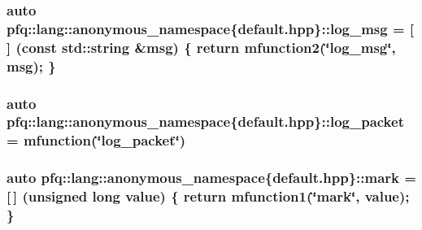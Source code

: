 \hypertarget{namespacepfq_1_1lang_1_1anonymous__namespace_02default_8hpp_03_a82e76226844f043aac9a2dd01615c9bb}{
\subsubsection[{log\+\_\+msg}]{\setlength{\rightskip}{0pt plus 5cm}auto pfq\+::lang\+::anonymous\+\_\+namespace\{default.\+hpp\}\+::log\+\_\+msg = \mbox{[}$\,$\mbox{]} (const std\+::string \&msg) \{ return {\bf mfunction2}(\char`\"{}log\+\_\+msg\char`\"{}, msg); \}}}\label{namespacepfq_1_1lang_1_1anonymous__namespace_02default_8hpp_03_a82e76226844f043aac9a2dd01615c9bb}
\hypertarget{namespacepfq_1_1lang_1_1anonymous__namespace_02default_8hpp_03_aed6076a98aece625738cbda3689183e2}{
\subsubsection[{log\+\_\+packet}]{\setlength{\rightskip}{0pt plus 5cm}auto pfq\+::lang\+::anonymous\+\_\+namespace\{default.\+hpp\}\+::log\+\_\+packet = {\bf mfunction}(\char`\"{}log\+\_\+packet\char`\"{})}}\label{namespacepfq_1_1lang_1_1anonymous__namespace_02default_8hpp_03_aed6076a98aece625738cbda3689183e2}
\hypertarget{namespacepfq_1_1lang_1_1anonymous__namespace_02default_8hpp_03_a7b831baeabda070b89ca862a9445a4a8}{
\subsubsection[{mark}]{\setlength{\rightskip}{0pt plus 5cm}auto pfq\+::lang\+::anonymous\+\_\+namespace\{default.\+hpp\}\+::mark = \mbox{[}$\,$\mbox{]} (unsigned long value) \{ return {\bf mfunction1}(\char`\"{}mark\char`\"{}, value); \}}}\label{namespacepfq_1_1lang_1_1anonymous__namespace_02default_8hpp_03_a7b831baeabda070b89ca862a9445a4a8}

